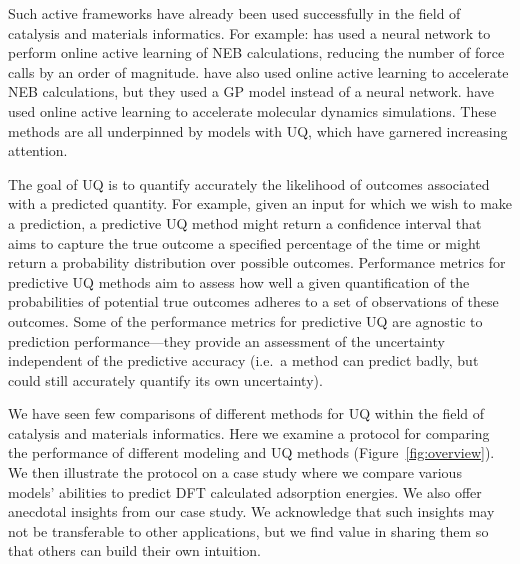 \documentclass[]{achemso}
\begin{document}
Such active frameworks have already been used successfully in the field of catalysis and materials informatics.
For example: \citet{Peterson2016} has used a neural network to perform online active learning of \gls{NEB} calculations, reducing the number of force calls by an order of magnitude.
\citet{Torres2018} have also used online active learning to accelerate \gls{NEB} calculations, but they used a \gls{GP} model instead of a neural network.
\citet{Jinnouchi2019} have used online active learning to accelerate molecular dynamics simulations.
These methods are all underpinned by models with \gls{UQ}, which have garnered increasing attention.\cite{Peterson2017, Musil2019}

The goal of \gls{UQ} is to quantify accurately the likelihood of outcomes associated with a predicted quantity.
For example, given an input for which we wish to make a prediction, a predictive \gls{UQ} method might return a confidence interval that aims to capture the true outcome a specified percentage of the time or might return a probability distribution over possible outcomes.
Performance metrics for predictive \gls{UQ} methods aim to assess how well a given quantification of the probabilities of potential true outcomes adheres to a set of observations of these outcomes.
Some of the performance metrics for predictive \gls{UQ} are agnostic to prediction performance---they provide an assessment of the uncertainty independent of the predictive accuracy (i.e.\ a method can predict badly, but could still accurately quantify its own uncertainty).

We have seen few\cite{Janet2019} comparisons of different methods for \gls{UQ} within the field of catalysis and materials informatics.
Here we examine a protocol\cite{Kuleshov2018} for comparing the performance of different modeling and \gls{UQ} methods (Figure~\ref{fig:overview}).
We then illustrate the protocol on a case study where we compare various models' abilities to predict \gls{DFT} calculated adsorption energies.
We also offer anecdotal insights from our case study.
We acknowledge that such insights may not be transferable to other applications, but we find value in sharing them so that others can build their own intuition.
\end{document}
